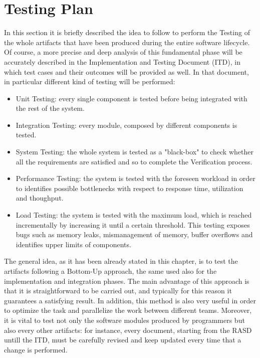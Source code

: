 \section{Testing Plan}
In this section it is briefly described the idea to follow to perform the Testing of the whole artifacts that have been produced during the entire software lifecycle. Of course, a more precise and deep analysis of this fundamental phase will be accurately described in the Implementation and Testing Document (ITD), in which test cases and their outcomes will be provided as well. In that document, in particular different kind of testing will be performed: \\
\begin{itemize}
	\item Unit Testing: every single component is tested before being integrated with the rest of the system.
	\item Integration Testing: every module, composed by different components is tested.
	\item System Testing: the whole system is tested as a "black-box" to check whether all the requirements are satisfied and so to complete the Verification process.
	\item Performance Testing: the system is tested with the foreseen workload in order to identifies possible bottlenecks with respect to response time, utilization and thoughput.
	\item Load Testing: the system is tested with the maximum load, which is reached incrementally by increasing it until a certain threshold. This testing exposes bugs such as memory leaks, mismanagement of memory, buffer overflows and identifies upper limits of components. \\
\end{itemize}
The general idea, as it has been already stated in this chapter, is to test the artifacts following a Bottom-Up approach, the same used also for the implementation and integration phases. The main advantage of this approach is that it is straightforward to be carried out, and typically for this reason it guarantees a satisfying result. In addition, this method is also very useful in order to optimize the task and parallelize the work between different teams. 
Moreover, it is vital to test not only the software modules produced by programmers but also every other artifacts: for instance, every document, starting from the RASD untill the ITD, must be carefully revised and keep updated every time that a change is performed.

